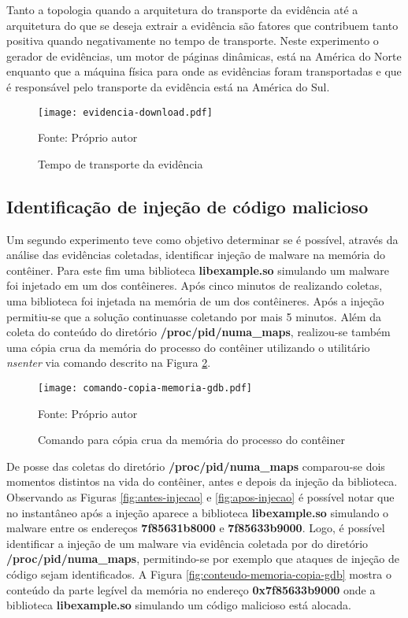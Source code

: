 %
Tanto a topologia quando a arquitetura do transporte da evidência até a arquitetura do que se deseja extrair a evidência são fatores que contribuem tanto positiva quando negativamente no tempo de transporte.
%
Neste experimento o gerador de evidências, um motor de páginas dinâmicas, está na América do Norte enquanto que a máquina física para onde as evidências foram transportadas e que é responsável pelo transporte da evidência está na América do Sul.

\begin{figure}[htb!]
\footnotesize
\caption{Tempo de transporte da evidência}
\texttt{[image: evidencia-download.pdf]}
\centering
\label{fig:evidencia_transporte}
\begin{center}
Fonte: Próprio autor 
\end{center}
\end{figure}


\subsection{Identificação de injeção de código malicioso}
\label{sec:proposta-exp-malware}

Um segundo experimento teve como objetivo determinar se é possível, através da análise das evidências coletadas, identificar injeção de malware na memória do contêiner.
%
Para este fim uma biblioteca \textbf{libexample.so} simulando um malware foi injetado em um dos contêineres.
%
Após cinco minutos de \fancyname realizando coletas, uma biblioteca foi injetada na memória de um dos contêineres. Após a injeção permitiu-se que a solução continuasse coletando por mais 5 minutos.
%
Além da coleta do conteúdo do diretório \textbf{/proc/pid/numa\_maps}, realizou-se também uma cópia crua da memória do processo do contêiner utilizando o utilitário \textit{nsenter} via comando descrito na Figura \ref{fig:comando-copia}.

\begin{figure}[htb!]
\footnotesize
\caption{Comando para cópia crua da memória do processo do contêiner}
\texttt{[image: comando-copia-memoria-gdb.pdf]}
\centering
\label{fig:comando-copia}
\begin{center}
Fonte: Próprio autor 
\end{center}
\end{figure}

%
De posse das coletas do diretório \textbf{/proc/pid/numa\_maps} comparou-se dois momentos distintos na vida do contêiner, antes e depois da injeção da biblioteca.
%
Observando as Figuras \ref{fig:antes-injecao} e \ref{fig:apos-injecao} é possível notar que no instantâneo após a injeção aparece a biblioteca \textbf{libexample.so} simulando o malware entre os endereços \textbf{7f85631b8000} e \textbf{7f85633b9000}.
%
Logo, é possível identificar a injeção de um malware via evidência coletada por \fancyname do diretório \textbf{/proc/pid/numa\_maps}, permitindo-se por exemplo que ataques de injeção de código sejam identificados.
%
A Figura \ref{fig:conteudo-memoria-copia-gdb} mostra o conteúdo da parte legível da memória no endereço \textbf{0x7f85633b9000} onde a biblioteca \textbf{libexample.so} simulando um código malicioso está alocada.

